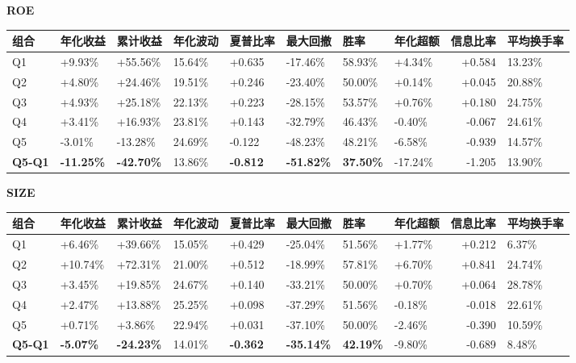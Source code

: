 \documentclass[UTF8,a4paper,11pt]{ctexart}
\begin{document}
\textbf{ROE}

\begin{table}[htbp]
\centering
\footnotesize
\begin{tabularx}{\textwidth}{@{}YYYYYYYYRY@{}}
\toprule
组合 & 年化收益 & 累计收益 & 年化波动 & 夏普比率 & 最大回撤 & 胜率 & 年化超额 & 信息比率 & 平均换手率 \\
\midrule
Q1 & +9.93\% & +55.56\% & 15.64\% & +0.635 & -17.46\% & 58.93\% & +4.34\% & +0.584 & 13.23\% \\
Q2 & +4.80\% & +24.46\% & 19.51\% & +0.246 & -23.40\% & 50.00\% & +0.14\% & +0.045 & 20.88\% \\
Q3 & +4.93\% & +25.18\% & 22.13\% & +0.223 & -28.15\% & 53.57\% & +0.76\% & +0.180 & 24.75\% \\
Q4 & +3.41\% & +16.93\% & 23.81\% & +0.143 & -32.79\% & 46.43\% & -0.40\% & -0.067 & 24.61\% \\
Q5 & -3.01\% & -13.28\% & 24.69\% & -0.122 & -48.23\% & 48.21\% & -6.58\% & -0.939 & 14.57\% \\
\textbf{Q5-Q1} & \textbf{-11.25\%} & \textbf{-42.70\%} & 13.86\% & \textbf{-0.812} & \textbf{-51.82\%} & \textbf{37.50\%} & -17.24\% & -1.205 & 13.90\% \\
\bottomrule
\end{tabularx}
\end{table}

\textbf{SIZE}

\begin{table}[htbp]
\centering
\footnotesize
\begin{tabularx}{\textwidth}{@{}YYYYYYYYRY@{}}
\toprule
组合 & 年化收益 & 累计收益 & 年化波动 & 夏普比率 & 最大回撤 & 胜率 & 年化超额 & 信息比率 & 平均换手率 \\
\midrule
Q1 & +6.46\% & +39.66\% & 15.05\% & +0.429 & -25.04\% & 51.56\% & +1.77\% & +0.212 & 6.37\% \\
Q2 & +10.74\% & +72.31\% & 21.00\% & +0.512 & -18.99\% & 57.81\% & +6.70\% & +0.841 & 24.74\% \\
Q3 & +3.45\% & +19.85\% & 24.67\% & +0.140 & -33.21\% & 50.00\% & +0.70\% & +0.064 & 28.78\% \\
Q4 & +2.47\% & +13.88\% & 25.25\% & +0.098 & -37.29\% & 51.56\% & -0.18\% & -0.018 & 22.61\% \\
Q5 & +0.71\% & +3.86\% & 22.94\% & +0.031 & -37.10\% & 50.00\% & -2.46\% & -0.390 & 10.59\% \\
\textbf{Q5-Q1} & \textbf{-5.07\%} & \textbf{-24.23\%} & 14.01\% & \textbf{-0.362} & \textbf{-35.14\%} & \textbf{42.19\%} & -9.80\% & -0.689 & 8.48\% \\
\bottomrule
\end{tabularx}
\end{table}
\end{document}
